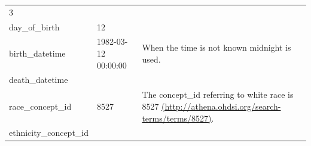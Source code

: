 \documentclass[]{book}
\begin{document}
\begin{longtable}[]{@{}lll@{}}
\begin{minipage}[t]{0.15\columnwidth}
3\strut
\end{minipage} & \begin{minipage}[t]{0.43\columnwidth}\raggedright
\strut
\end{minipage}\tabularnewline
\begin{minipage}[t]{0.33\columnwidth}\raggedright
day\_of\_birth\strut
\end{minipage} & \begin{minipage}[t]{0.15\columnwidth}\raggedright
12\strut
\end{minipage} & \begin{minipage}[t]{0.43\columnwidth}\raggedright
\strut
\end{minipage}\tabularnewline
\begin{minipage}[t]{0.33\columnwidth}\raggedright
birth\_datetime\strut
\end{minipage} & \begin{minipage}[t]{0.15\columnwidth}\raggedright
1982-03-12 00:00:00\strut
\end{minipage} & \begin{minipage}[t]{0.43\columnwidth}\raggedright
When the time is not known midnight is used.\strut
\end{minipage}\tabularnewline
\begin{minipage}[t]{0.33\columnwidth}\raggedright
death\_datetime\strut
\end{minipage} & \begin{minipage}[t]{0.15\columnwidth}\raggedright
\strut
\end{minipage} & \begin{minipage}[t]{0.43\columnwidth}\raggedright
\strut
\end{minipage}\tabularnewline
\begin{minipage}[t]{0.33\columnwidth}\raggedright
race\_concept\_id\strut
\end{minipage} & \begin{minipage}[t]{0.15\columnwidth}\raggedright
8527\strut
\end{minipage} & \begin{minipage}[t]{0.43\columnwidth}\raggedright
The concept\_id referring to white race is 8527 \href{http://athena.ohdsi.org/search-terms/terms/8527}{(http://athena.ohdsi.org/search-terms/terms/8527)}.\strut
\end{minipage}\tabularnewline
\begin{minipage}[t]{0.33\columnwidth}\raggedright
ethnicity\_concept\_id\strut
\end{minipage} & \begin{minipage}[t]{0.15\columnwidth}\raggedright

\end{minipage}
\end{longtable}
\end{document}
